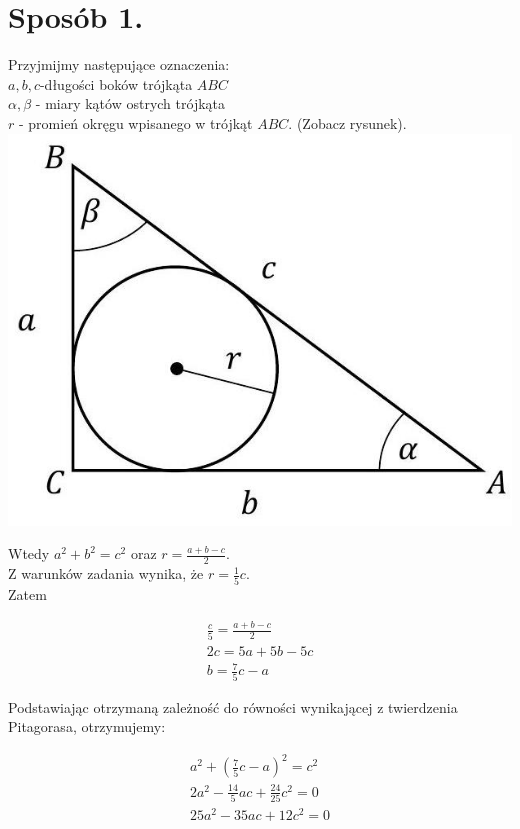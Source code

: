 \documentclass[10pt]{article}
\begin{document}
\section*{Sposób 1.}
Przyjmijmy następujące oznaczenia:\\
$a, b, c$-długości boków trójkąta $A B C$\\
$\alpha, \beta$ - miary kątów ostrych trójkąta\\
$r$ - promień okręgu wpisanego w trójkąt $A B C$. (Zobacz rysunek).\\
\includegraphics[max width=\textwidth, center]{2025_02_07_36131546116d12814c9cg-39}

Wtedy $a^{2}+b^{2}=c^{2}$ oraz $r=\frac{a+b-c}{2}$.\\
Z warunków zadania wynika, że $r=\frac{1}{5} c$.\\
Zatem

$$
\begin{gathered}
\frac{c}{5}=\frac{a+b-c}{2} \\
2 c=5 a+5 b-5 c \\
b=\frac{7}{5} c-a
\end{gathered}
$$

Podstawiając otrzymaną zależność do równości wynikającej z twierdzenia Pitagorasa, otrzymujemy:

$$
\begin{gathered}
a^{2}+\left(\frac{7}{5} c-a\right)^{2}=c^{2} \\
2 a^{2}-\frac{14}{5} a c+\frac{24}{25} c^{2}=0 \\
25 a^{2}-35 a c+12 c^{2}=0
\end{gathered}
$$
\end{document}
